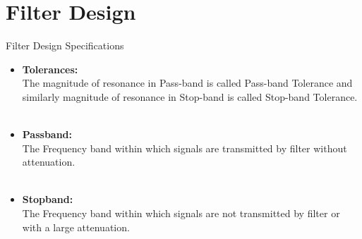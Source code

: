 \documentclass{beamer}
\begin{document}
\section{Filter Design}
\begin{frame}{Filter Design Specifications}
\begin{itemize}
    \item \textbf{Tolerances:}\\
The magnitude of resonance in Pass-band is called Pass-band Tolerance and
similarly magnitude of resonance in Stop-band is called Stop-band Tolerance.\\~\\
\item \textbf{Passband:}\\
The Frequency band within which signals are transmitted by filter without
attenuation.\\~\\

\item \textbf{Stopband:}\\
The Frequency band within which signals are not transmitted by filter or with a large attenuation.\\~\\
\end{itemize}
\end{frame}
\end{document}
